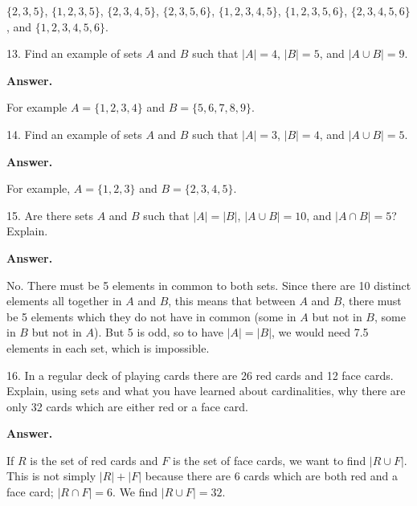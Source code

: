 \documentclass[10pt,]{book}
\theoremstyle{plain}
\theoremstyle{definition}
\theoremstyle{definition}
\theoremstyle{definition}
\begin{document}
\begin{exerciselist}
            \(\{2,3,5\}\), \(\{1,2,3,5\}\), \(\{2,3,4,5\}\), \(\{2,3,5,6\}\), \(\{1,2,3,4,5\}\), \(\{1,2,3,5,6\}\), \(\{2,3,4,5,6\}\), and \(\{1,2,3,4,5,6\}\).
\item[13.]\hypertarget{exercise-13}{}
            Find an example of sets \(A\) and \(B\) such that \(|A| = 4\), \(|B| = 5\), and \(|A \cup B| = 9\).
\par\smallskip
\par\smallskip
\noindent\textbf{Answer.}\hypertarget{answer-13}{}\quad

            For example \(A = \{1,2,3,4\}\) and \(B = \{5,6,7,8,9\}\).
\item[14.]\hypertarget{exercise-14}{}
            Find an example of sets \(A\) and \(B\) such that \(|A| = 3\), \(|B| = 4\), and \(|A \cup B| = 5\).
\par\smallskip
\par\smallskip
\noindent\textbf{Answer.}\hypertarget{answer-14}{}\quad

            For example, \(A = \{1,2,3\}\) and \(B = \{2,3,4,5\}\).
\item[15.]\hypertarget{exercise-15}{}
            Are there sets \(A\) and \(B\) such that \(|A| = |B|\), \(|A\cup B| = 10\), and \(|A\cap B| = 5\)? Explain.
\par\smallskip
\par\smallskip
\noindent\textbf{Answer.}\hypertarget{answer-15}{}\quad

            No. There must be 5 elements in common to both sets. Since there are 10 distinct elements all together in \(A\) and \(B\), this means that between \(A\) and \(B\), there must be 5 elements which they do not have in common (some
            in \(A\) but not in \(B\), some in \(B\) but not in \(A\)). But 5 is odd, so to have \(|A| = |B|\), we would need 7.5 elements in each set, which is impossible.
\item[16.]\hypertarget{exercise-16}{}
            In a regular deck of playing cards there are 26 red cards and 12 face cards. Explain, using sets and what you have learned about cardinalities, why there are only 32 cards which are either red or a face card.
\par\smallskip
\par\smallskip
\noindent\textbf{Answer.}\hypertarget{answer-16}{}\quad

            If \(R\) is the set of red cards and \(F\) is the set of face cards, we want to find \(|R \cup F|\). This is not simply \(|R| + |F|\) because there are 6 cards which are both red and a face card; \(|R \cap F| = 6\). We find
            \(|R \cup F| = 32\).
\end{exerciselist}
%
%
%
\appendix
%
\typeout{************************************************}
\typeout{************************************************}
\end{document}

